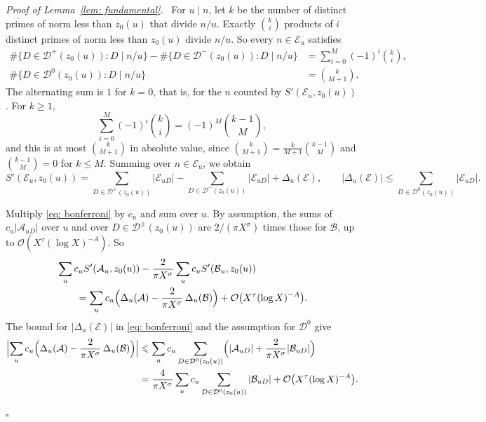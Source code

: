 \documentclass{article}
\numberwithin{equation}{section}
\newenvironment{proof}[1][Proof]{\par\medskip\noindent\textit{#1.}\ }{\hfill$\square$\par\medskip}
\newcommand{\Le}{\leqslant}
\newcommand{\Ge}{\geqslant}
\begin{document}
\begin{proof}[Proof of Lemma~\ref{lem: fundamental}]
For $u \mid n$, let $k$ be the number of distinct primes of norm less than $z_0(u)$ that divide $n/u$. Exactly $\binom{k}{i}$ products of $i$ distinct primes of norm less than $z_0(u)$ divide $n/u$. So every $n \in \mathcal{E}_u$ satisfies
\begin{equation*}
\begin{aligned}
\#\{D \in \mathcal{D}^+(z_0(u)) : D \mid n/u\} - \#\{D \in \mathcal{D}^-(z_0(u)) : D \mid n/u\} &= \sum_{i=0}^{M} (-1)^i \binom{k}{i}, \\
\#\{D \in \mathcal{D}^0(z_0(u)) : D \mid n/u\} &= \binom{k}{M+1}.
\end{aligned}
\end{equation*}
The alternating sum is $1$ for $k = 0$, that is, for the $n$ counted by $S'(\mathcal{E}_u, z_0(u))$. For $k \Ge 1$,
\begin{equation*}
\sum_{i=0}^{M} (-1)^i \binom{k}{i} = (-1)^M \binom{k - 1}{M},
\end{equation*}
and this is at most $\binom{k}{M+1}$ in absolute value, since $\binom{k}{M+1} = \frac{k}{M+1} \binom{k - 1}{M}$ and $\binom{k - 1}{M} = 0$ for $k \Le M$. Summing over $n \in \mathcal{E}_u$, we obtain
\begin{equation}
\label{eq: bonferroni}
S'(\mathcal{E}_u, z_0(u)) = \sum_{D \in \mathcal{D}^+(z_0(u))} |\mathcal{E}_{uD}| - \sum_{D \in \mathcal{D}^-(z_0(u))} |\mathcal{E}_{uD}| + \Delta_u(\mathcal{E}), \qquad |\Delta_u(\mathcal{E})| \Le \sum_{D \in \mathcal{D}^0(z_0(u))} |\mathcal{E}_{uD}|.
\end{equation}

Multiply \eqref{eq: bonferroni} by $c_u$ and sum over $u$. By assumption, the sums of $c_u |\mathcal{A}_{uD}|$ over $u$ and over $D \in \mathcal{D}^{\pm}(z_0(u))$ are $2/(\pi X^{\sigma})$ times those for $\mathcal{B}$, up to $\mathcal{O}(X^{\tau}(\log X)^{-A})$. So
\begin{equation*}
\begin{aligned}
&\sum_u c_u S'(\mathcal{A}_u, z_0(u)) - \frac{2}{\pi X^{\sigma}} \sum_u c_u S'(\mathcal{B}_u, z_0(u)) \\
&\qquad = \sum_u c_u \Bigl( \Delta_u(\mathcal{A}) - \frac{2}{\pi X^{\sigma}}\, \Delta_u(\mathcal{B}) \Bigr) + \mathcal{O}\bigl(X^{\tau}(\log X)^{-A}\bigr).
\end{aligned}
\end{equation*}
The bound for $|\Delta_u(\mathcal{E})|$ in \eqref{eq: bonferroni} and the assumption for $\mathcal{D}^0$ give
\begin{equation*}
\begin{aligned}
\Bigl| \sum_u c_u \Bigl( \Delta_u(\mathcal{A}) - \frac{2}{\pi X^{\sigma}}\, \Delta_u(\mathcal{B}) \Bigr) \Bigr| &\Le \sum_u c_u \sum_{D \in \mathcal{D}^0(z_0(u))} \Bigl( |\mathcal{A}_{uD}| + \frac{2}{\pi X^{\sigma}} |\mathcal{B}_{uD}| \Bigr) \\
&= \frac{4}{\pi X^{\sigma}} \sum_u c_u \sum_{D \in \mathcal{D}^0(z_0(u))} |\mathcal{B}_{uD}| + \mathcal{O}\bigl(X^{\tau}(\log X)^{-A}\bigr).
\end{aligned}
\end{equation*}


\end{proof}
\end{document}
